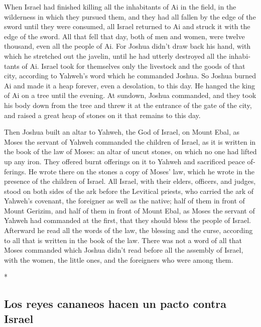 \begin{paracol}{2}
\begin{otherlanguage}{english}
 When Israel had finished killing all the inhabitants of
Ai in the field, in the wilderness in which they pursued them, and they
had all fallen by the edge of the sword until they were consumed, all
Israel returned to Ai and struck it with the edge of the sword.
 All that fell that day, both of men and women, were
twelve thousand, even all the people of Ai.  For Joshua
didn't draw back his hand, with which he stretched out the javelin,
until he had utterly destroyed all the inhabitants of Ai.
 Israel took for themselves only the livestock and the
goods of that city, according to Yahweh's word which he commanded
Joshua.  So Joshua burned Ai and made it a heap forever,
even a desolation, to this day.  He hanged the king of Ai
on a tree until the evening. At sundown, Joshua commanded, and they took
his body down from the tree and threw it at the entrance of the gate of
the city, and raised a great heap of stones on it that remains to this
day.

 Then Joshua built an altar to Yahweh, the God of Israel,
on Mount Ebal,  as Moses the servant of Yahweh commanded
the children of Israel, as it is written in the book of the law of
Moses: an altar of uncut stones, on which no one had lifted up any iron.
They offered burnt offerings on it to Yahweh and sacrificed peace
offerings.  He wrote there on the stones a copy of Moses'
law, which he wrote in the presence of the children of Israel.
 All Israel, with their elders, officers, and judges,
stood on both sides of the ark before the Levitical priests, who carried
the ark of Yahweh's covenant, the foreigner as well as the native; half
of them in front of Mount Gerizim, and half of them in front of Mount
Ebal, as Moses the servant of Yahweh had commanded at the first, that
they should bless the people of Israel.  Afterward he
read all the words of the law, the blessing and the curse, according to
all that is written in the book of the law.  There was
not a word of all that Moses commanded which Joshua didn't read before
all the assembly of Israel, with the women, the little ones, and the
foreigners who were among them.

\end{otherlanguage}

\switchcolumn[0]*

\hypertarget{los-reyes-cananeos-hacen-un-pacto-contra-israel}{%
\subsection{Los reyes cananeos hacen un pacto contra
Israel}\label{los-reyes-cananeos-hacen-un-pacto-contra-israel}}


\end{paracol}
